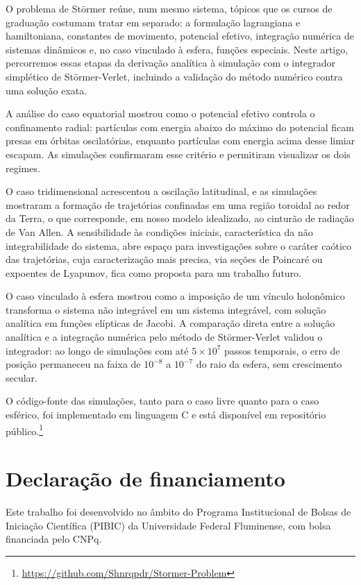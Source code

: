 \documentclass[twocolumn]{rbef}
\begin{document}
O problema de Störmer reúne, num mesmo sistema, tópicos que os cursos de graduação costumam tratar em separado: a formulação lagrangiana e hamiltoniana, constantes de movimento, potencial efetivo, integração numérica de sistemas dinâmicos e, no caso vinculado à esfera, funções especiais. Neste artigo, percorremos essas etapas da derivação analítica à simulação com o integrador simplético de Störmer-Verlet, incluindo a validação do método numérico contra uma solução exata.

A análise do caso equatorial mostrou como o potencial efetivo controla o confinamento radial: partículas com energia abaixo do máximo do potencial ficam presas em órbitas oscilatórias, enquanto partículas com energia acima desse limiar escapam. As simulações confirmaram esse critério e permitiram visualizar os dois regimes.

O caso tridimensional acrescentou a oscilação latitudinal, e as simulações mostraram a formação de trajetórias confinadas em uma região toroidal ao redor da Terra, o que corresponde, em nosso modelo idealizado, ao cinturão de radiação de Van Allen. A sensibilidade às condições iniciais, característica da não integrabilidade do sistema, abre espaço para investigações sobre o caráter caótico das trajetórias, cuja caracterização mais precisa, via seções de Poincaré ou expoentes de Lyapunov, fica como proposta para um trabalho futuro.

O caso vinculado à esfera mostrou como a imposição de um vínculo holonômico transforma o sistema não integrável em um sistema integrável, com solução analítica em funções elípticas de Jacobi. A comparação direta entre a solução analítica e a integração numérica pelo método de Störmer-Verlet validou o integrador: ao longo de simulações com até $5 \times 10^7$ passos temporais, o erro de posição permaneceu na faixa de $10^{-8}$ a $10^{-7}$ do raio da esfera, sem crescimento secular.

O código-fonte das simulações, tanto para o caso livre quanto para o caso esférico, foi implementado em linguagem C e está disponível em repositório público.\footnote{\url{https://github.com/Shnrqpdr/Stormer-Problem}}

\section*{Declaração de financiamento}

Este trabalho foi desenvolvido no âmbito do Programa Institucional de Bolsas de Iniciação Científica (PIBIC) da Universidade Federal Fluminense, com bolsa financiada pelo CNPq.
\end{document}

